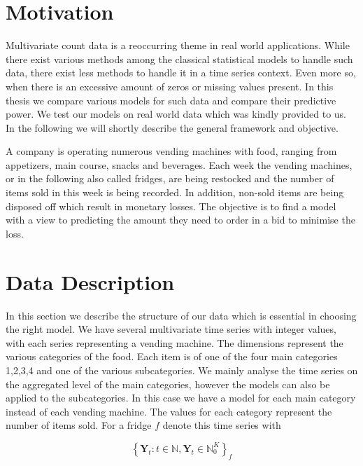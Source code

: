 \section{Motivation}
\label{sec:Motivation}

Multivariate count data is a reoccurring theme in real world applications. While there exist various methods among the classical statistical models to handle such data, there exist less methods to handle it in a time series context. Even more so, when there is an excessive amount of zeros or missing values present. In this thesis we compare various models for such data and compare their predictive power. We test our models on real world data which was kindly provided to us. In the following we will shortly describe the general framework and objective. 

A company is operating numerous vending machines with food, ranging from appetizers, main course, snacks and beverages. Each week the vending machines, or in the following also called fridges, are being restocked and the number of items sold in this week is being recorded. In addition, non-sold items are being disposed off which result in monetary losses. The objective is to find a model with a view to predicting the amount they need to order in a bid to minimise the loss.

\section{Data Description}
\label{sec: Data Description}

In this section we describe the structure of our data which is essential in choosing the right model. We have several multivariate time series with integer values, with each series representing a vending machine. The dimensions represent the various categories of the food. Each item is of one of the four main categories 1,2,3,4 and one of the various subcategories. We mainly analyse the time series on the aggregated level of the main categories, however the models can also be applied to the subcategories. In this case we have a model for each main category instead of each vending machine. The values for each category represent the number of items sold. For a fridge $f$ denote this time series with 

\begin{equation}
\left\{\bm{Y}_t:t\in \mathbb{N}, \bm{Y}_t \in \mathbb{N}_0^K \right\}_f
\label{eq:time series definition}
\end{equation}

